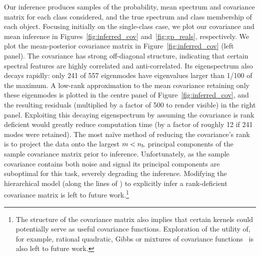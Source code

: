 \documentclass[a4paper,fleqn,usenatbib]{mnras}
\newcommand{\nb}{n_{\rm b}}
\begin{document}
Our inference produces samples of the probability, mean spectrum and covariance matrix for each class considered, and the true spectrum and class membership of each object. Focusing initially on the single-class case, we plot our covariance and mean inference in Figures~\ref{fig:inferred_cov} and~\ref{fig:gp_reals}, respectively. We plot the mean-posterior covariance matrix in Figure~\ref{fig:inferred_cov} (left panel). The covariance has strong off-diagonal structure, indicating that certain spectral features are highly correlated and anti-correlated. Its eigenspectrum also decays rapidly: only 241 of 557 eigenmodes have eigenvalues larger than 1/100 of the maximum. A low-rank approximation to the mean covariance retaining only these eigenmodes is plotted in the centre panel of Figure~\ref{fig:inferred_cov}, and the resulting residuals (multiplied by a factor of 500 to render visible) in the right panel. Exploiting this decaying eigenspectrum by assuming the covariance is rank deficient would greatly reduce computation time (by a factor of roughly 12 if 241 modes were retained). The most na\"ive method of reducing the covariance's rank is to project the data onto the largest $m < \nb$ principal components of the sample covariance matrix prior to inference. Unfortunately, as the sample covariance contains both noise and signal its principal components are suboptimal for this task, severely degrading the inference. Modifying the hierarchical model (along the lines of \citet{Zhang_etal:2013}) to explicitly infer a rank-deficient covariance matrix is left to future work.\footnote{The structure of the covariance matrix also implies that certain kernels could potentially serve as useful covariance functions. Exploration of the utility of, for example, rational quadratic, Gibbs or mixtures of covariance functions~\citep{Rasmussen_Williams} is also left to future work.}
\end{document}
